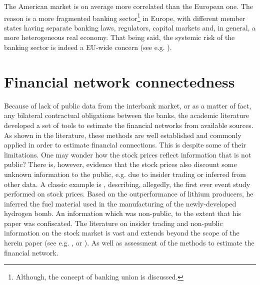 \documentclass[12pt]{article}
\begin{document}
The American market is on average more correlated than the European one. The reason is a more fragmented banking sector\footnote{Although, the concept of banking union is discussed.} in Europe, with different member states having separate banking laws, regulators, capital markets and, in general, a more heterogeneous real economy. That being said, the systemic risk of the banking sector is indeed a EU-wide concern (see e.g. \cite{song21}). 

\section{Financial network connectedness}\label{section:fin_network}

Because of lack of public data from the interbank market, or as a matter of fact, any bilateral contractual obligations between the banks, the academic literature developed a set of tools to estimate the financial networks from available sources. As shown in the literature, these methods are well established and commonly applied in order to estimate financial connections. This is despite some of their limitations. One may wonder how the stock prices reflect information that is not public? There is, however, evidence that the stock prices also discount some unknown information to the public, e.g. due to insider trading or inferred from other data. A classic example is \cite{newhard14}, describing, allegedly, the first ever event study performed on stock prices. Based on the outperformance of lithium producers, he inferred the fuel material used in the manufacturing of the newly-developed hydrogen bomb. An information which was non-public, to the extent that his paper was confiscated. The literature on insider trading and non-public information on the stock market is vast and extends beyond the scope of the herein paper (see e.g. \cite{hawk90}, \cite{huddart07} or \cite{klein20}). As well as assessment of the methods to estimate the financial network.
\end{document}
